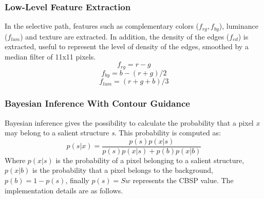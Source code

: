 \subsubsection{Low-Level Feature Extraction}
In the selective path, features such as complementary colors ($ f_{rg}, f_{by}$), luminance 
($ f_{lum} $) and texture are extracted. In addition, the density of the 
edges ($ f_{ed} $) is extracted, useful to represent the level of density of the edges, 
smoothed by a median filter of 11x11 pixels.
$$ f_{rg} = r-g $$
$$ f_{by} = b-(r+g)/2 $$
$$ f_{lum} = (r+g+b)/3 $$


\subsubsection{Bayesian Inference With Contour Guidance}
Bayesian inference gives the possibility to calculate the probability that a 
pixel \emph{x} may belong to a salient structure \emph{s}. This probability is computed as:
$$ p(s|x) = \frac{p(s)p(x|s)}{p(s)p(x|s)+p(b)p(x|b) } $$
Where $ p(x|s) $ is the probability of a pixel belonging to a salient structure, 
$ p(x|b) $ is the probability that a pixel belongs to the background, $ p(b)=1-p(s) $,
finally $ p(s)=Sw $ represents the CBSP value. The implementation 
details are as follows.
